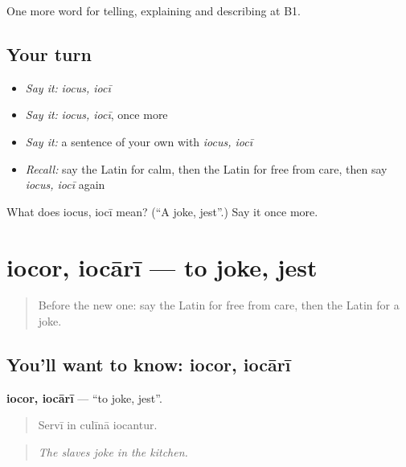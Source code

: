 \begin{grammarlens}[title={What you've built}]
One more word for telling, explaining and describing at B1.
\end{grammarlens}

\subsection*{Your turn}
\begin{itemize}
\raggedright
  \item \emph{Say it:} \emph{iocus, iocī}
  \item \emph{Say it:} \emph{iocus, iocī}, once more
  \item \emph{Say it:} a sentence of your own with \emph{iocus, iocī}
  \item \emph{Recall:} say the Latin for calm, then the Latin for free from care, then say \emph{iocus, iocī} again
\end{itemize}

\begin{tcolorbox}[breakable,colback=teal!4,colframe=teal!35!black,title={Before you move on}]
What does iocus, iocī mean? (\textquotedblleft{}A joke, jest\textquotedblright{}.) Say it once more.
\end{tcolorbox}
\section[iocor, iocārī]{iocor, iocārī — to joke, jest}

\label{lesson:LA-C502-iocor}



\begin{quote}
Before the new one: say the Latin for free from care, then the Latin for a joke.
\end{quote}

\subsection*{You'll want to know: iocor, iocārī}
\textbf{iocor, iocārī} — \textquotedblleft{}to joke, jest\textquotedblright{}.

\begin{quote}
Servī in culīnā iocantur.
\end{quote}

\begin{quote}
\emph{The slaves joke in the kitchen.}
\end{quote}

